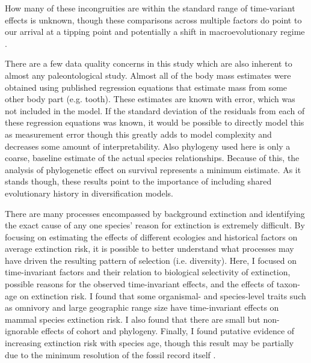 \documentclass{nature}
\begin{document}
How many of these incongruities are within the standard range of time-variant effects is unknown, though these comparisons across multiple factors do point to our arrival at a tipping point \cite{Barnosky2012a,Barnosky2011} and potentially a shift in macroevolutionary regime \cite{Jablonski1986}.


There are a few data quality concerns in this study which are also inherent to almost any paleontological study. Almost all of the body mass estimates were obtained using published regression equations that estimate mass from some other body part (e.g. tooth). These estimates are known with error, which was not included in the model. If the standard deviation of the residuals from each of these regression equations was known, it would be possible to directly model this as measurement error \cite{Gelman2013d} though this greatly adds to model complexity and decreases some amount of interpretability.  Also phylogeny used here is only a coarse, baseline estimate of the actual species relationships. Because of this, the analysis of phylogenetic effect on survival represents a minimum eistimate. As it stands though, these results point to the importance of including shared evolutionary history in diversification models.


There are many processes encompassed by background extinction and identifying the exact cause of any one species' reason for extinction is extremely difficult. By focusing on estimating the effects of different ecologies and historical factors on average extinction risk, it is possible to better understand what processes may have driven the resulting pattern of selection (i.e. diversity). Here, I focused on time-invariant factors and their relation to biological selectivity of extinction, possible reasons for the observed time-invariant effects, and the effects of taxon-age on extinction risk. I found that some organismal- and species-level traits such as omnivory and large geographic range size have time-invariant effects on mammal species extinction risk. I also found that there are small but non-ignorable effects of cohort and phylogeny. Finally, I found putative evidence of increasing extinction risk with species age, though this result may be partially due to the minimum resolution of the fossil record itself \cite{Sepkoski1975}.
\end{document}
